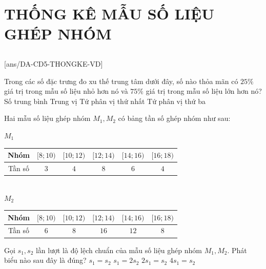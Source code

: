 \section{THỐNG KÊ MẪU SỐ LIỆU GHÉP NHÓM}
\subsection{\vdmh}
[ans/DA-CD5-THONGKE-VD]
\begin{vd}
    Trong các số đặc trưng đo xu thế trung tâm dưới đây, số nào thỏa mãn có $25\%$ giá trị trong mẫu số liệu nhỏ hơn nó và $75\%$ giá trị trong mẫu số liệu lớn hơn nó?
    \choice
    {Số trung bình}
    {Trung vị}
    {\True Tứ phân vị thứ nhất}
    {Tứ phân vị thứ ba}
\end{vd}
\begin{vd}[MH BGD-2025]
    Hai mẫu số liệu ghép nhóm $M_1, M_2$ có bảng tần số ghép nhóm như sau:
    \begin{center}
        $M_1$ \quad
    \begin{tabular}{|c|c|c|c|c|c|}
        \hline
        Nhóm & $[8;10)$ & $[10;12)$ & $[12;14)$ & $[14;16)$ & $[16;18)$ \\
        \hline
        Tần số & $3$ & $4$ & $8$ & $6$ & $4$ \\
        \hline
    \end{tabular}
    \\
    $M_2$ \quad
    \begin{tabular}{|c|c|c|c|c|c|}
        \hline
        Nhóm & $[8;10)$ & $[10;12)$ & $[12;14)$ & $[14;16)$ & $[16;18)$ \\
        \hline
        Tần số & $6$ & $8$ & $16$ & $12$ & $8$ \\
        \hline
    \end{tabular}
    \end{center}
    Gọi $s_1, s_2$ lần lượt là độ lệch chuẩn của mẫu số liệu ghép nhóm $M_1, M_2$. Phát biểu nào sau đây là đúng?
    \choice
    {\True $s_1 = s_2$}
    {$s_1 = 2s_2$}
    {$2s_1 = s_2$}
    {$4s_1 = s_2$}
\end{vd}
